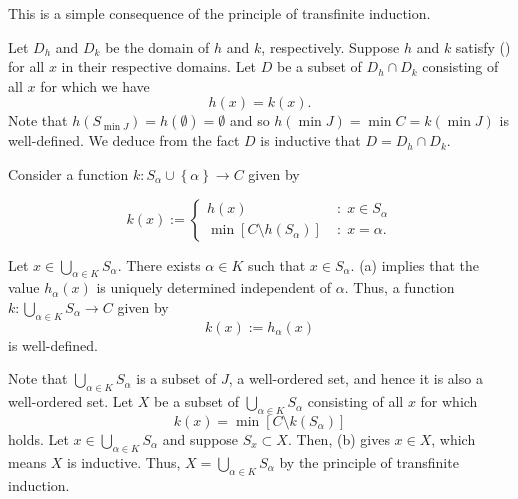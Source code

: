 \documentclass[a4paper,12pt]{article}
\begin{document}
\begin{sol}\leavevmode \par
	This is a simple consequence of the principle of transfinite induction.
	
	Let
	\( D_{h} \)
	and
	\( D_k \)
	be the domain of \( h \) and \( k \),
	respectively.
	Suppose \( h \) and \( k \) satisfy () for all \( x \)
	in their respective domains.
	Let \( D \) be a subset of \( D_h \cap D_k \) 
	consisting of all \(  x \) for which we have
	\begin{equation*}
		h(x) = k(x).
	\end{equation*}
	Note that
	\( h(S_{\min{J}}) = h(\emptyset) = \emptyset \)
	and so
	\( h(\min{J}) = \min{C} = k(\min{J}) \)
	is well-defined.
	We deduce from the fact
	\( D \)
	is inductive that
	\( D= D_h \cap D_k\).
	
	Consider a function
	\( k :S_{\alpha}\cup \left\{ \alpha \right\}\to C \)
	given by
	
	\begin{equation*}
		k(x):=	 \begin{cases}
			h(x) & \;\mathrm{:}\; x \in S_{\alpha} \\
			\min{\left[ C \setminus h(S_{\alpha}) \right] }
			     & \;\mathrm{:}\;x=\alpha.
		\end{cases}
	\end{equation*}
	
	Let \(  x \in \bigcup_{\alpha \in K} S_{\alpha}\).
	There exists \( \alpha \in K \) such that \(  x \in S_{\alpha} \).
	(a) implies that the value \( h_{\alpha}(x) \) is uniquely determined independent of \( \alpha \).
	Thus, a function	
	\( k: \bigcup_{\alpha \in K} S_{\alpha}\to C \)
	given by
	\begin{equation*}
		k(x):=h_{\alpha}(x)
	\end{equation*}
	is well-defined.
	
	Note that \( \bigcup_{\alpha \in K} S_{\alpha} \) is a subset of \( J \),
	a well-ordered set, and hence it is also a well-ordered set.
	Let \( X \) be a subset of \( \bigcup_{\alpha \in K} S_{\alpha} \)
	consisting of all \( x \) for which 
	\begin{equation*}
		k(x) = \min{\left[ C \setminus k(S_{\alpha}) \right]}
	\end{equation*}
	holds.
	Let \(  x \in \bigcup_{\alpha \in K} S_{\alpha} \)
	and suppose \( S_x \subset X \).
	Then, (b) gives \(  x \in X \),
	which means \( X \) is inductive.
	Thus, \( X = \bigcup_{\alpha \in K} S_{\alpha} \)
	by the principle of transfinite induction.
	

\end{sol}
\end{document}

